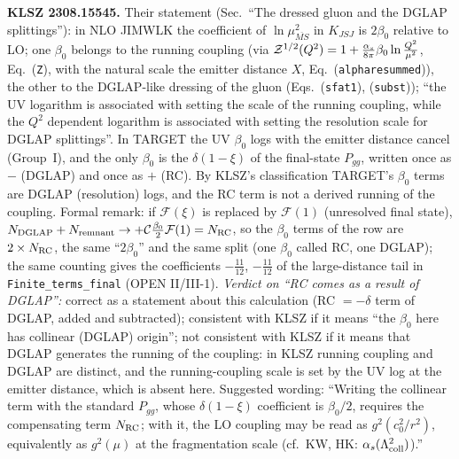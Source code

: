 \noindent\textbf{KLSZ 2308.15545.} Their statement (Sec.~``The dressed gluon and the DGLAP splittings''): in NLO JIMWLK the coefficient of $\ln\mu^{2}_{\overline{MS}}$ in $K_{JSJ}$ is $2\beta_{0}$ relative to LO; one $\beta_{0}$ belongs to the running coupling (via ${\cal Z}^{1/2}(Q^{2})=1+\frac{\alpha_{s}}{8\pi}\beta_{0}\ln\frac{Q^{2}}{\mu^{2}}$, Eq.~(\texttt{Z}), with the natural scale the emitter distance $X$, Eq.~(\texttt{alpharesummed})), the other to the DGLAP-like dressing of the gluon (Eqs.~(\texttt{sfat1}), (\texttt{subst})); ``the UV logarithm is associated with setting the scale of the running coupling, while the $Q^{2}$ dependent logarithm is associated with setting the resolution scale for DGLAP splittings''. In TARGET the UV $\beta_{0}$ logs with the emitter distance cancel (Group~I), and the only $\beta_{0}$ is the $\delta(1-\xi)$ of the final-state $P_{gg}$, written once as $-$ (DGLAP) and once as $+$ (RC). By KLSZ's classification TARGET's $\beta_{0}$ terms are DGLAP (resolution) logs, and the RC term is not a derived running of the coupling. Formal remark: if $\mathcal{F}(\xi)$ is replaced by $\mathcal{F}(1)$ (unresolved final state), $N_{\rm DGLAP}+N_{\rm remnant}\to+\mathcal{C}\frac{\beta_{0}}{2}\mathcal{F}(1)=N_{\rm RC}$, so the $\beta_{0}$ terms of the row are $2\times N_{\rm RC}$, the same ``$2\beta_{0}$'' and the same split (one $\beta_{0}$ called RC, one DGLAP); the same counting gives the coefficients $-\frac{11}{12}$, $-\frac{11}{12}$ of the large-distance tail in \texttt{Finite\_terms\_final} (OPEN II/III-1). \emph{Verdict on ``RC comes as a result of DGLAP'':} correct as a statement about this calculation (RC $=-\delta$ term of DGLAP, added and subtracted); consistent with KLSZ if it means ``the $\beta_{0}$ here has collinear (DGLAP) origin''; not consistent with KLSZ if it means that DGLAP generates the running of the coupling: in KLSZ running coupling and DGLAP are distinct, and the running-coupling scale is set by the UV log at the emitter distance, which is absent here. Suggested wording: ``Writing the collinear term with the standard $P_{gg}$, whose $\delta(1-\xi)$ coefficient is $\beta_{0}/2$, requires the compensating term $N_{\rm RC}$; with it, the LO coupling may be read as $g^{2}(c_{0}^{2}/r^{2})$, equivalently as $g^{2}(\mu)$ at the fragmentation scale (cf.\ KW, HK: $\alpha_{s}(\Lambda^{2}_{\rm coll})$).''

